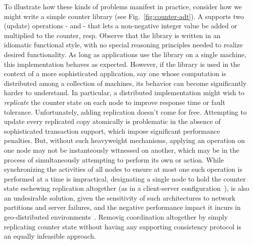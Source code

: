 To illustrate how these kinds of problems manifest in practice,
consider how we might write a simple counter library (see
Fig.~\ref{fig:counter-adt}).  A  supports two (update)
operations -  and  - that lets a non-negative integer
value be added or multiplied to the counter, resp.  Observe that the
library is written in an idiomatic functional style, with no special
reasoning principles needed to realize desired functionality.  As long
as applications use the library on a single machine, this
implementation behaves as expected.  However, if the library is used
in the context of a more sophisticated application, say one whose
computation is distributed among a collection of machines, its
behavior can become significantly harder to understand.  In
particular, a distributed implementation might wish to
\emph{replicate} the counter state on each node to improve response
time or fault tolerance.  Unfortunately, adding replication doesn't
come for free.  Attempting to update every replicated copy atomically
is problematic in the absence of sophisticated transaction support,
which impose significant performance penalties.  But, without such
heavyweight mechanisms, applying an  operation on one node may
not be instanteously witnessed on another, which may be in the process of
simultaneously attempting to perform its own  or 
action.  While synchronizing the activities of all nodes to ensure at
most one such operation is performed at a time is impractical,
designating a single node to hold the counter state eschewing
replication altogether (as in a client-server
configuration~\cite{Armstrong}), is also an undesirable solution,
given the sensitivity of such architectures to network partitions and server failures, and
the negative performance impact it incurs in geo-distributed
environments~\cite{Walter}.  Removig coordination altogether by simply
replicating counter state without having any supporting consistency
protocol is an equally infeasible approach.

